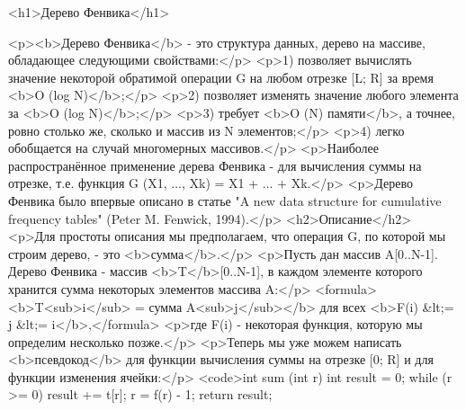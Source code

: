 <h1>Дерево Фенвика</h1>

<p><b>Дерево Фенвика</b> - это структура данных, дерево на массиве, обладающее следующими свойствами:</p>
<p>1) позволяет вычислять значение некоторой обратимой операции G на любом отрезке [L; R] за время <b>O (log N)</b>;</p>
<p>2) позволяет изменять значение любого элемента за <b>O (log N)</b>;</p>
<p>3) требует <b>O (N) памяти</b>, а точнее, ровно столько же, сколько и массив из N элементов;</p>
<p>4) легко обобщается на случай многомерных массивов.</p>
<p>Наиболее распространённое применение дерева Фенвика - для вычисления суммы на отрезке, т.е. функция G (X1, ..., Xk) = X1 + ... + Xk.</p>
<p>Дерево Фенвика было впервые описано в статье "A new data structure for cumulative frequency tables" (Peter M. Fenwick, 1994).</p>
<h2>Описание</h2>
<p>Для простоты описания мы предполагаем, что операция G, по которой мы строим дерево, - это <b>сумма</b>.</p>
<p>Пусть дан массив A[0..N-1]. Дерево Фенвика - массив <b>T</b>[0..N-1], в каждом элементе которого хранится сумма некоторых элементов массива A:</p>
<formula><b>T<sub>i</sub> = сумма A<sub>j</sub></b> для всех <b>F(i) &lt;= j &lt;= i</b>,</formula>
<p>где F(i) - некоторая функция, которую мы определим несколько позже.</p>
<p>Теперь мы уже можем написать <b>псевдокод</b> для функции вычисления суммы на отрезке [0; R] и для функции изменения ячейки:</p>
<code>int sum (int r)
{
	int result = 0;
	while (r >= 0) {
		result += t[r];
		r = f(r) - 1;
	}
	return result;
}

